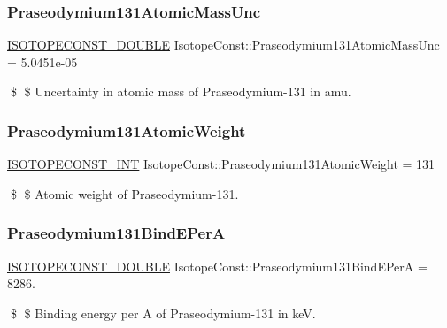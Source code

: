 \subsubsection{\texorpdfstring{Praseodymium131\+Atomic\+Mass\+Unc}{Praseodymium131AtomicMassUnc}}
{\footnotesize\ttfamily \mbox{\hyperlink{group___isotope_const-_macros_ga8f45a7272ce02c0b4c65c44636ed719a}{I\+S\+O\+T\+O\+P\+E\+C\+O\+N\+S\+T\+\_\+\+D\+O\+U\+B\+LE}} Isotope\+Const\+::\+Praseodymium131\+Atomic\+Mass\+Unc = 5.\+0451e-\/05}

\$ \$ Uncertainty in atomic mass of Praseodymium-\/131 in amu. \mbox{\label{group___isotope_const-_praseodymium-_pr131_ga0502111b8aca86ffcb4beb528d1a1bec}} 
\subsubsection{\texorpdfstring{Praseodymium131\+Atomic\+Weight}{Praseodymium131AtomicWeight}}
{\footnotesize\ttfamily \mbox{\hyperlink{group___isotope_const-_macros_ga5f18360b3e99483a35c32d789e62621c}{I\+S\+O\+T\+O\+P\+E\+C\+O\+N\+S\+T\+\_\+\+I\+NT}} Isotope\+Const\+::\+Praseodymium131\+Atomic\+Weight = 131}

\$ \$ Atomic weight of Praseodymium-\/131. \mbox{\label{group___isotope_const-_praseodymium-_pr131_ga57380cfedbae54711d9069f3d8cf3866}} 
\subsubsection{\texorpdfstring{Praseodymium131\+Bind\+E\+PerA}{Praseodymium131BindEPerA}}
{\footnotesize\ttfamily \mbox{\hyperlink{group___isotope_const-_macros_ga8f45a7272ce02c0b4c65c44636ed719a}{I\+S\+O\+T\+O\+P\+E\+C\+O\+N\+S\+T\+\_\+\+D\+O\+U\+B\+LE}} Isotope\+Const\+::\+Praseodymium131\+Bind\+E\+PerA = 8286.}

\$ \$ Binding energy per A of Praseodymium-\/131 in keV. \mbox{\label{group___isotope_const-_praseodymium-_pr131_ga987d7ffcd7349aa43016da3d6789fe20}} 
